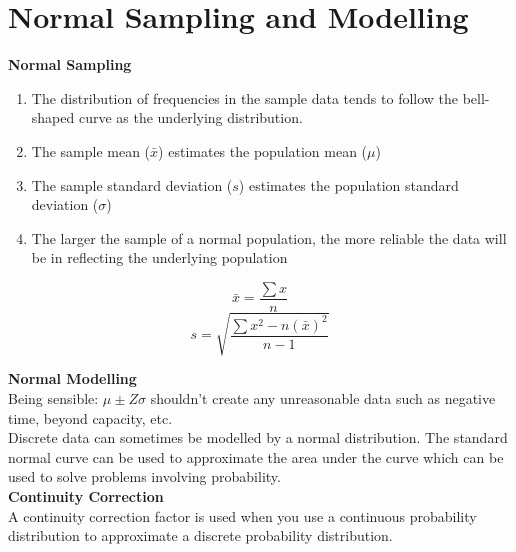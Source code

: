 \documentclass{article}
\begin{document}
\section{Normal Sampling and Modelling}
\large \textbf{Normal Sampling}
\begin{enumerate}
    \item The distribution of frequencies in the sample data tends to follow the bell-shaped curve as the underlying distribution.
    \item The sample mean (\(\bar{x}\)) estimates the population mean (\(\mu\))
    \item The sample standard deviation (\(s\)) estimates the population standard deviation (\(\sigma\))
    \item The larger the sample of a normal population, the more reliable the data will be in reflecting the underlying population
\end{enumerate}
\[\bar{x} = \frac{\sum x}{n}\]
\[s = \sqrt{\frac{\sum x^2 - n(\bar{x})^2}{n-1}}\]
\begin{center}
\end{center}
\large \textbf{Normal Modelling}\\
Being sensible: \(\mu \pm \textit{Z}\sigma\) shouldn't create any unreasonable data such as negative time, beyond capacity, etc.\\
Discrete data can sometimes be modelled by a normal distribution. The standard normal curve can be used to approximate the area under the curve which can be used to solve problems involving probability.\\
\[\]
\large \textbf{Continuity Correction}\\
A continuity correction factor is used when you use a continuous probability distribution to approximate a discrete probability distribution.
\end{document}
